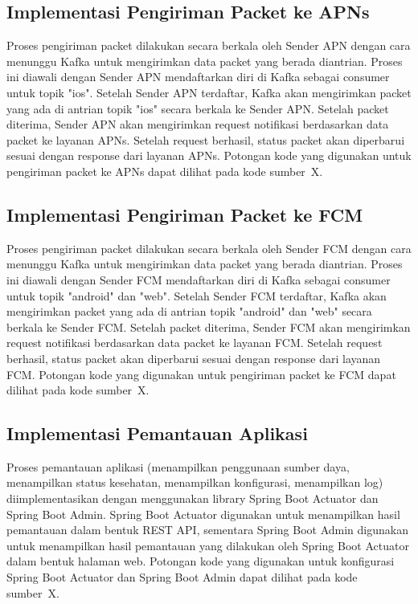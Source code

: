\subsection{Implementasi Pengiriman Packet ke APNs}
\par Proses pengiriman packet dilakukan secara berkala oleh Sender APN dengan cara menunggu Kafka untuk mengirimkan data packet yang berada diantrian. Proses ini diawali dengan Sender APN mendaftarkan diri di Kafka sebagai consumer untuk topik "ios". Setelah Sender APN terdaftar, Kafka akan mengirimkan packet yang ada di antrian topik "ios" secara berkala ke Sender APN. Setelah packet diterima, Sender APN akan mengirimkan request notifikasi berdasarkan data packet ke layanan APNs. Setelah request berhasil, status packet akan diperbarui sesuai dengan response dari layanan APNs. Potongan kode yang digunakan untuk pengiriman packet ke APNs dapat dilihat pada kode sumber~X.

\subsection{Implementasi Pengiriman Packet ke FCM}
\par Proses pengiriman packet dilakukan secara berkala oleh Sender FCM dengan cara menunggu Kafka untuk mengirimkan data packet yang berada diantrian. Proses ini diawali dengan Sender FCM mendaftarkan diri di Kafka sebagai consumer untuk topik "android" dan "web". Setelah Sender FCM terdaftar, Kafka akan mengirimkan packet yang ada di antrian topik "android" dan "web" secara berkala ke Sender FCM. Setelah packet diterima, Sender FCM akan mengirimkan request notifikasi berdasarkan data packet ke layanan FCM. Setelah request berhasil, status packet akan diperbarui sesuai dengan response dari layanan FCM. Potongan kode yang digunakan untuk pengiriman packet ke FCM dapat dilihat pada kode sumber~X.

\subsection{Implementasi Pemantauan Aplikasi}
\par Proses pemantauan aplikasi (menampilkan penggunaan sumber daya, menampilkan status kesehatan, menampilkan konfigurasi, menampilkan log) diimplementasikan dengan menggunakan library Spring Boot Actuator dan Spring Boot Admin. Spring Boot Actuator digunakan untuk menampilkan hasil pemantauan dalam bentuk REST API, sementara Spring Boot Admin digunakan untuk menampilkan hasil pemantauan yang dilakukan oleh Spring Boot Actuator dalam bentuk halaman web. Potongan kode yang digunakan untuk konfigurasi Spring Boot Actuator dan Spring Boot Admin dapat dilihat pada kode sumber~X.
